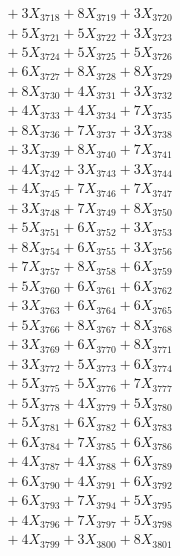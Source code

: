 \documentclass[a4paper,10pt]{article}
\begin{document}
{\begin{align}
&\;  + 3 X_{3718} + 8 X_{3719} + 3 X_{3720} \\[0.3ex]
&\;  + 5 X_{3721} + 5 X_{3722} + 3 X_{3723} \\[0.3ex]
&\;  + 5 X_{3724} + 5 X_{3725} + 5 X_{3726} \\[0.3ex]
&\;  + 6 X_{3727} + 8 X_{3728} + 8 X_{3729} \\[0.5ex]\allowbreak
&\;  + 8 X_{3730} + 4 X_{3731} + 3 X_{3732} \\[0.3ex]
&\;  + 4 X_{3733} + 4 X_{3734} + 7 X_{3735} \\[0.3ex]
&\;  + 8 X_{3736} + 7 X_{3737} + 3 X_{3738} \\[0.3ex]
&\;  + 3 X_{3739} + 8 X_{3740} + 7 X_{3741} \\[0.3ex]
&\;  + 4 X_{3742} + 3 X_{3743} + 3 X_{3744} \\[0.3ex]
&\;  + 4 X_{3745} + 7 X_{3746} + 7 X_{3747} \\[0.3ex]
&\;  + 3 X_{3748} + 7 X_{3749} + 8 X_{3750} \\[0.3ex]
&\;  + 5 X_{3751} + 6 X_{3752} + 3 X_{3753} \\[0.3ex]
&\;  + 8 X_{3754} + 6 X_{3755} + 3 X_{3756} \\[0.3ex]
&\;  + 7 X_{3757} + 8 X_{3758} + 6 X_{3759} \\[0.5ex]\allowbreak
&\;  + 5 X_{3760} + 6 X_{3761} + 6 X_{3762} \\[0.3ex]
&\;  + 3 X_{3763} + 6 X_{3764} + 6 X_{3765} \\[0.3ex]
&\;  + 5 X_{3766} + 8 X_{3767} + 8 X_{3768} \\[0.3ex]
&\;  + 3 X_{3769} + 6 X_{3770} + 8 X_{3771} \\[0.3ex]
&\;  + 3 X_{3772} + 5 X_{3773} + 6 X_{3774} \\[0.3ex]
&\;  + 5 X_{3775} + 5 X_{3776} + 7 X_{3777} \\[0.3ex]
&\;  + 5 X_{3778} + 4 X_{3779} + 5 X_{3780} \\[0.3ex]
&\;  + 5 X_{3781} + 6 X_{3782} + 6 X_{3783} \\[0.3ex]
&\;  + 6 X_{3784} + 7 X_{3785} + 6 X_{3786} \\[0.3ex]
&\;  + 4 X_{3787} + 4 X_{3788} + 6 X_{3789} \\[0.5ex]\allowbreak
&\;  + 6 X_{3790} + 4 X_{3791} + 6 X_{3792} \\[0.3ex]
&\;  + 6 X_{3793} + 7 X_{3794} + 5 X_{3795} \\[0.3ex]
&\;  + 4 X_{3796} + 7 X_{3797} + 5 X_{3798} \\[0.3ex]
&\;  + 4 X_{3799} + 3 X_{3800} + 8 X_{3801} \\[0.3ex]

\end{align}}
\end{document}
